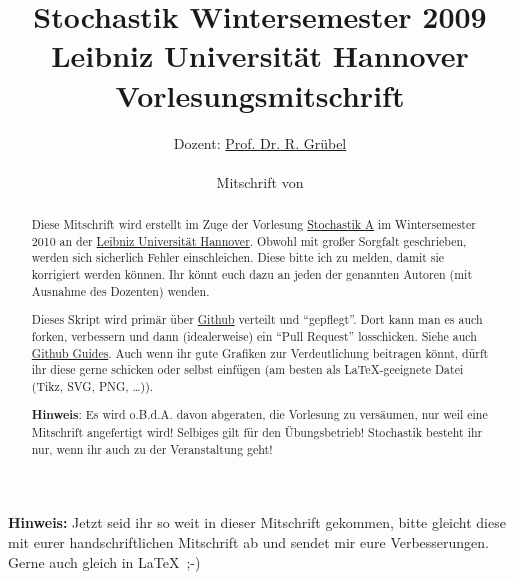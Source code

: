 \documentclass[a4paper,twoside,12pt]{article}
\title{Stochastik Wintersemester 2009\\Leibniz Universit\"at Hannover\\Vorlesungsmitschrift}
\author{Dozent: \href{mailto:rgrubel@stochastik.uni-hannover.de}{Prof. Dr. R. Gr\"ubel}\\ \vspace{1em} \\
Mitschrift von\\
}
\begin{document}
\pagestyle{empty}
\maketitle
\begin{abstract}
    Diese Mitschrift wird erstellt im Zuge der Vorlesung \href{http://www.stochastik.uni-hannover.de/ws2010.html}{Stochastik A} im Wintersemester 2010 an der \href{http://www.uni-hannover.de}{Leibniz Universit\"at Hannover}. Obwohl mit gro\ss er Sorgfalt geschrieben, werden sich sicherlich Fehler einschleichen. Diese bitte ich zu melden, damit sie korrigiert werden k\"onnen. Ihr k\"onnt euch dazu an jeden der genannten Autoren (mit Ausnahme des Dozenten) wenden.

    Dieses Skript wird prim\"ar \"uber \href{http://github.com/rbecher/luh-vorlesungen-inf-ws10-stoch}{Github} verteilt und "`gepflegt"'. Dort kann man es auch forken, verbessern und dann (idealerweise) ein "`Pull Request"' losschicken. Siehe auch  \href{http://github.com/guides}{Github Guides}. Auch wenn ihr gute Grafiken zur Verdeutlichung beitragen k\"onnt, d\"urft ihr diese gerne schicken oder selbst einf\"ugen (am besten als \LaTeX -geeignete Datei (Tikz, SVG, PNG, \dots)).

    \textbf{Hinweis}: Es wird o.B.d.A. davon abgeraten, die Vorlesung zu vers\"aumen, nur weil eine Mitschrift angefertigt wird! Selbiges gilt f\"ur den \"Ubungsbetrieb! Stochastik besteht ihr nur, wenn ihr auch zu der Veranstaltung geht!
\end{abstract}

\newpage %

\tableofcontents


\newpage

\pagestyle{fancy}
\addtolength{\headheight}{\baselineskip}
\renewcommand{\sectionmark}[1]{\markboth{#1}{}}
\renewcommand{\subsectionmark}[1]{\markright{#1}}
\fancyhead[LO,RE]{\leftmark\\\rightmark}






\newpage
\textbf{Hinweis:} Jetzt seid ihr so weit in dieser Mitschrift gekommen, bitte gleicht diese mit eurer handschriftlichen Mitschrift ab und sendet mir eure Verbesserungen. Gerne auch gleich in \LaTeX\ ;-)





%

%
\end{document}
